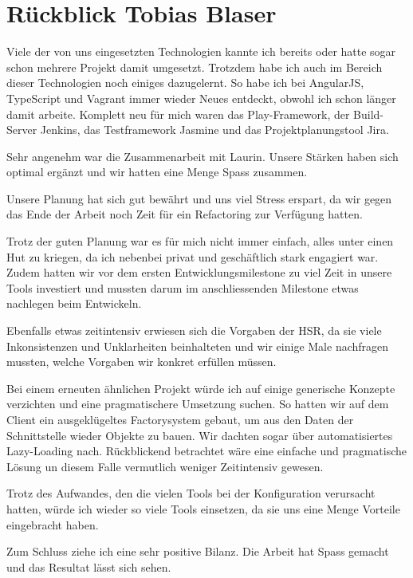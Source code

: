 	\section*{Rückblick Tobias Blaser}
		
		
		Viele der von uns eingesetzten Technologien kannte ich bereits oder hatte sogar schon mehrere Projekt damit umgesetzt.
		Trotzdem habe ich auch im Bereich dieser Technologien noch einiges dazugelernt.
		So habe ich bei AngularJS, TypeScript und Vagrant immer wieder Neues entdeckt, obwohl ich schon länger damit arbeite.
		Komplett neu für mich waren das Play-Framework, der Build-Server Jenkins, das Testframework Jasmine und das Projektplanungstool Jira.
		
		
		Sehr angenehm war die Zusammenarbeit mit Laurin. Unsere Stärken haben sich optimal ergänzt und wir hatten eine Menge Spass zusammen.
		
		Unsere Planung hat sich gut bewährt und uns viel Stress erspart, da wir gegen das Ende der Arbeit noch Zeit für ein Refactoring zur Verfügung hatten.
		
		
		Trotz der guten Planung war es für mich nicht immer einfach, alles unter einen Hut zu kriegen, da ich nebenbei privat und geschäftlich stark engagiert war.
		Zudem hatten wir vor dem ersten Entwicklungsmilestone zu viel Zeit in unsere Tools investiert und mussten darum im anschliessenden Milestone etwas nachlegen beim Entwickeln.
		
		Ebenfalls etwas zeitintensiv erwiesen sich die Vorgaben der HSR, da sie viele Inkonsistenzen und Unklarheiten beinhalteten und wir einige Male nachfragen mussten, welche Vorgaben wir konkret erfüllen müssen.
		
		
		Bei einem erneuten ähnlichen Projekt würde ich auf einige generische Konzepte verzichten und eine pragmatischere Umsetzung suchen. So hatten wir auf dem Client ein ausgeklügeltes Factorysystem gebaut, um aus den Daten der Schnittstelle wieder Objekte zu bauen.
		Wir dachten sogar über automatisiertes Lazy-Loading nach. 
		Rückblickend betrachtet wäre eine einfache und pragmatische Lösung un diesem Falle vermutlich weniger Zeitintensiv gewesen.
		

		Trotz des Aufwandes, den die vielen Tools bei der Konfiguration verursacht hatten, würde ich wieder so viele Tools einsetzen, da sie uns eine Menge Vorteile eingebracht haben.
				
		
		Zum Schluss ziehe ich eine sehr positive Bilanz.
		Die Arbeit hat Spass gemacht und das Resultat lässt sich sehen.
